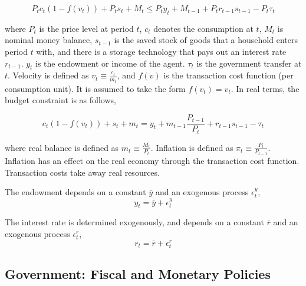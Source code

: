 \documentclass[hidelinks]{article}
\begin{document}



\begin{equation}
	P_t c_t (1 - f(v_t)) + P_t s_t  + M_t \leq P_t y_t +  M_{t-1} + P_t r_{t-1} s_{t-1} - P_t \tau_t
	\label{NBC}
\end{equation}


where $P_t$ is the price level at period $t$, $c_t$ denotes the consumption at $t$, $M_t$ is nominal money balance, $s_{t-1}$ is the saved stock of goods that a household enters period $t$ with, and there is a storage technology that pays out an interest rate $r_{t-1}$. $y_t$ is the endowment or income of the agent. $\tau_t$ is the government transfer at $t$. Velocity is defined as $v_t \equiv \frac{c_t}{m_t}$, and $f(v)$ is the transaction cost function (per consumption unit). It is assumed to take the form $f(v_t) = v_t$. In real terms, the budget constraint is as follows,

\begin{equation}
	c_t (1 - f(v_t))+ s_{t} + m_{t} = y_t + m_{t-1} \frac{P_{t-1}}{P_t} + r_{t-1} s_{t-1} - \tau_t 
	\label{bcc}
\end{equation} 

where real balance is defined as $m_t \equiv \frac{M_t}{P_t}$. Inflation is defined as $\pi_t \equiv \frac{P_t}{P_{t-1}}$. Inflation has an effect on the real economy through the transaction cost function. Transaction costs take away real resources. 

The endowment depends on a constant $\bar{y}$ and an exogenous process $\epsilon_t^y$,
\begin{equation}
	y_t = \bar{y} + \epsilon_t^y
	\label{endowment}
\end{equation}

The interest rate is determined exogenously, and depends on a constant $\bar{r}$ and an exogenous process  $\epsilon_t^r$,
\begin{equation}
	r_t = \bar{r} + \epsilon_t^r
	\label{interest}
\end{equation}




\subsection{Government: Fiscal and Monetary Policies}
\end{document}
